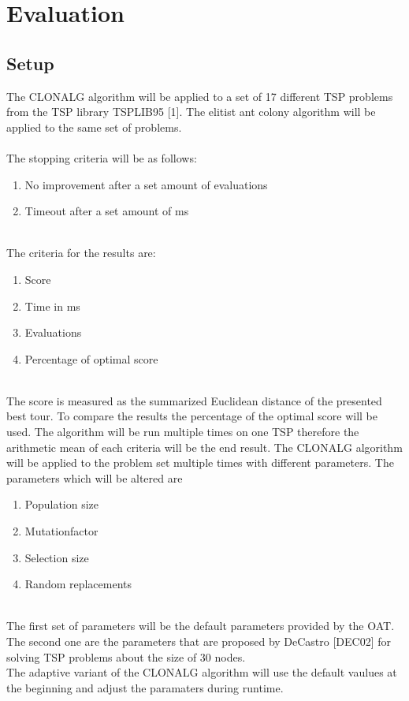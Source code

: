 \chapter{Evaluation}
\label{chap:eva}
\section{Setup}
The CLONALG algorithm will be applied to a set of 17 different TSP problems from the TSP library TSPLIB95 [1]. The elitist ant colony algorithm will be applied to the same set of problems.\\\\ 
The stopping criteria will be as follows:
\begin{enumerate}
	\item 	No improvement after a set amount of evaluations
	\item 	Timeout after a set amount of ms
\end{enumerate}\\
The criteria for the results are:
\begin{enumerate}
	\item 	Score
	\item 	Time in ms
	\item 	Evaluations	
	\item  	Percentage of optimal score
\end{enumerate}\\
The score is measured as the summarized Euclidean distance of the presented best tour. To compare the results the percentage of the optimal score will be used. The algorithm will be run multiple times on one TSP therefore the arithmetic mean of each criteria will be the end result. The CLONALG algorithm will be applied to the problem set multiple times with different parameters.
The parameters which will be altered are
\begin{enumerate}
	\item 	Population size
	\item 	Mutationfactor
	\item 	Selection size
	\item 	Random replacements	
\end{enumerate}\\
The first set of parameters will be the default parameters provided by the OAT. The second one are the parameters that are proposed by DeCastro [DEC02] for solving TSP problems about the size of 30 nodes.\\
The adaptive variant of the CLONALG algorithm will use the default vaulues at the beginning and adjust the paramaters during runtime.\\
